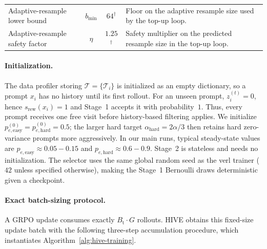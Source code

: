 \begin{table}[t]
\begin{tabular}{>{\raggedright\arraybackslash}p{3.9cm} c c >{\raggedright\arraybackslash}p{6.1cm}}
Adaptive-resample lower bound         & $b_{\mathrm{min}}$      & $64$$^{\dagger}$ & Floor on the adaptive resample size used by the top-up loop. \\
Adaptive-resample safety factor       & $\eta$                  & $1.25$$^{\dagger}$ & Safety multiplier on the predicted resample size in the top-up loop. \\
\bottomrule
\end{tabular}
\end{table}

\paragraph{Initialization.}
The data profiler storing $\mathcal{T}=\{\mathcal{T}_i\}$ is initialized as an empty dictionary, so a prompt $x_i$ has no history until its first rollout. For an unseen prompt, $z_i^{(t)}{=}0$, hence $s_{\mathrm{rew}}(x_i){=}1$ and Stage~1 accepts it with probability~$1$. Thus, every prompt receives one free visit before history-based filtering applies. We initialize $p_{e,\mathrm{easy}}^{(0)}{=}p_{e,\mathrm{hard}}^{(0)}{=}0.5$; the larger hard target $\alpha_{\mathrm{hard}}{=}2\alpha/3$ then retains hard zero-variance prompts more aggressively. In our main runs, typical steady-state values are $p_{e,\mathrm{easy}}{\approx}0.05{-}0.15$ and $p_{e,\mathrm{hard}}{\approx}0.6{-}0.9$. Stage~2 is stateless and needs no initialization. The selector uses the same global random seed as the verl trainer ($42$ unless specified otherwise), making the Stage~1 Bernoulli draws deterministic given a checkpoint.

\paragraph{Exact batch-sizing protocol.}
A GRPO update consumes exactly $B_{\mathrm{t}}\cdot G$ rollouts. HIVE obtains this fixed-size update batch with the following three-step accumulation procedure, which instantiates Algorithm~\ref{alg:hive-training}.

